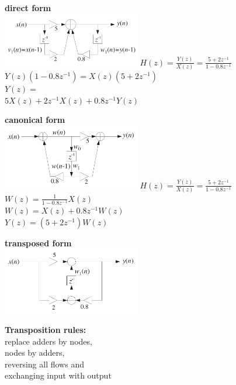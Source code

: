 \begin{multicols}{3}
  \textbf{direct form }\\
  \includegraphics[width=6cm]{./picture/direct_form}
  	$H(z) = \frac{Y(z)}{X(z)} = \frac{5+2z^{-1}}{1-0.8z^{-1}}$ \\
  	$Y(z)(1-0.8z^{-1}) = X(z)(5+2z^{-1})$ \\
  	$Y(z) = $ \\ $5 X(z) + 2 z^{-1} X(z) + 0.8 z^{-1} Y(z)$
 
  
  \columnbreak
  
  \textbf{canonical form }\\
  \includegraphics[width=6cm]{./picture/canonical_form}
  	$ H(z) = \frac{Y(z)}{X(z)} = \frac{5+2z^{-1}}{1-0.8z^{-1}}$ \\
  	$ W(z) = \frac{1}{1-0.8z^{-1}} X(z)$ \\
  	$ W(z) = X(z) + 0.8 z^{-1} W(z)$ \\
  	$ Y(z) = (5+2z^{-1}) W(z)$
  \columnbreak
  
  \textbf{transposed form }\\
  \includegraphics[width=6cm]{./picture/transposed_form}
  
  \textbf{Transposition rules:} \\
  replace adders by nodes, \\
  nodes by adders, \\
  reversing all flows and \\
  exchanging input with output
\end{multicols}

